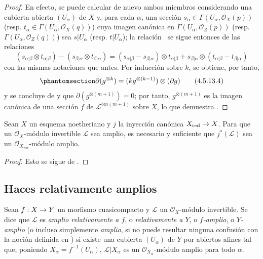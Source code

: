 \documentclass[oneside,10pt]{amsart}
\makeatletter
\newcommand{\ega@arrow}[2]{\mathchoice{#1}{#2}{#2}{#2}}
\renewcommand{\to}{\ega@arrow{\longrightarrow}{\rightarrow}}
\newcommand{\oldpage}[2][]{\marginnote{\normalfont\footnotesize\textbf{#1}~|~#2}\ignorespaces}
\let\EGAOriginalLabel\label
\renewcommand{\label}[1]{\phantomsection\EGAOriginalLabel{#1}}
\makeatother
\begin{document}
\begin{proof}
  En efecto, se puede calcular de nuevo ambos miembros considerando una cubierta abierta $(U_\alpha)$ de $X$ y, para cada $\alpha$, una sección $s_\alpha\in\Gamma(U_\alpha,\mathcal{O}_X(p))$ (resp. $t_\alpha\in\Gamma(U_\alpha,\mathcal{O}_X(q))$) cuya imagen canónica en $\Gamma(U_\alpha,\mathcal{O}_Z(p))$ (resp. $\Gamma(U_\alpha,\mathcal{O}_Z(q))$) sea $s|U_\alpha$ (resp. $t|U_\alpha$);
  la relación~ se sigue entonces de las relaciones
  \[
  (s_{\alpha|\beta}\otimes t_{\alpha|\beta})
  -(s_{\beta|\alpha}\otimes t_{\beta|\alpha})
  =(s_{\alpha|\beta}-s_{\beta|\alpha})\otimes t_{\alpha|\beta}
  +s_{\beta|\alpha}\otimes(t_{\alpha|\beta}-t_{\beta|\alpha})
\]
  con las mismas notaciones que antes.
  Por inducción sobre $k$, se obtiene, por tanto,
  \begin{equation}
\label{II.4.5.13.4-fr}
  \partial(g^{\otimes k})=(kg^{\otimes(k-1)})\otimes(\partial g)
\tag{4.5.13.4}
\end{equation}
\oldpage[II]{89}
  y se concluye de  y  que $\partial(g^{\otimes(m+1)})=0$;
  por tanto, $g^{\otimes(m+1)}$ es la imagen canónica de una sección $f$ de $\mathcal{L}^{\otimes n(m+1)}$ sobre $X$, lo que demuestra .
\end{proof}

\begin{corollary}[4.5.14]
\label{II.4.5.14-fr}
Sean $X$ un esquema noetheriano y $j$ la inyección canónica $X_{\mathrm{red}}\to X$.
Para que un $\mathcal{O}_X$-módulo invertible $\mathcal{L}$ sea amplio, es necesario y suficiente que $j^*(\mathcal{L})$ sea un $\mathcal{O}_{X_{\mathrm{red}}}$-módulo amplio.
\end{corollary}

\begin{proof}
Esto se sigue de .
\end{proof}

\subsection{Haces relativamente amplios}
\label{II.4.6-fr}

\begin{definition}[4.6.1]
\label{II.4.6.1-fr}
Sean $f:X\to Y$ un morfismo cuasicompacto y $\mathcal{L}$ un $\mathcal{O}_X$-módulo invertible.
Se dice que $\mathcal{L}$ es \emph{amplio relativamente a $f$}, o \emph{relativamente a $Y$}, o \emph{$f$-amplio}, o \emph{$Y$-amplio} \textup{(o incluso simplemente \emph{amplio}, si no puede resultar ninguna confusión con la noción definida en )} si existe una cubierta $(U_\alpha)$ de $Y$ por abiertos afines tal que, poniendo $X_\alpha=f^{-1}(U_\alpha)$, $\mathcal{L}|X_\alpha$ es un $\mathcal{O}_{X_\alpha}$-módulo amplio para todo $\alpha$.
\end{definition}
\end{document}
